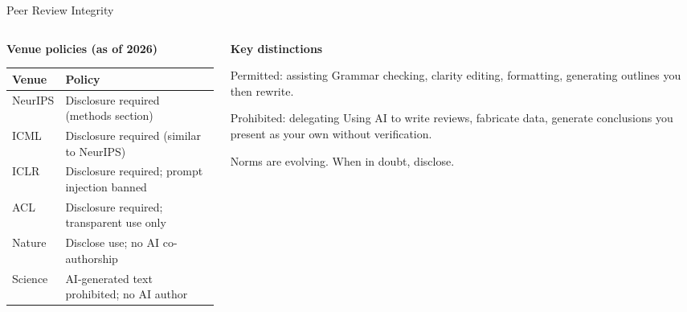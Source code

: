 \begin{frame}{Peer Review Integrity}
  \begin{columns}[T, onlytextwidth]
    \begin{column}{0.55\textwidth}
      \textbf{Venue policies (as of 2026)}\\[0.4em]
      {\footnotesize
      \begin{tabular}{@{}lp{4.8cm}@{}}
        \toprule
        \textbf{Venue} & \textbf{Policy} \\
        \midrule
        NeurIPS & Disclosure required (methods section) \\
        ICML    & Disclosure required (similar to NeurIPS) \\
        ICLR    & Disclosure required; prompt injection banned \\
        ACL     & Disclosure required; transparent use only \\
        Nature  & Disclose use; no AI co-authorship \\
        Science & AI-generated text prohibited; no AI author \\
        \bottomrule
      \end{tabular}}
    \end{column}
    \hfill
    \begin{column}{0.42\textwidth}
      \textbf{Key distinctions}\\[0.3em]
      \begin{block}{Permitted: assisting}
        Grammar checking, clarity editing, formatting, generating outlines you then rewrite.
      \end{block}
      \vspace{0.4em}
      \begin{alertblock}{Prohibited: delegating}
        Using AI to write reviews, fabricate data, generate conclusions you present as your own without verification.
      \end{alertblock}
      \vspace{0.4em}
      \small Norms are evolving. When in doubt, disclose.
    \end{column}
  \end{columns}
\end{frame}

